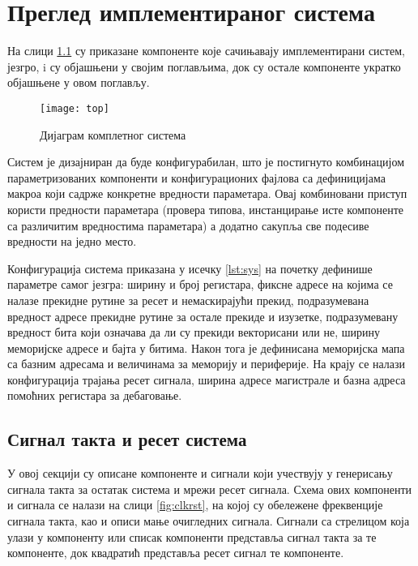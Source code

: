 \chapter{Преглед имплементираног система}

На слици \ref{fig:top} су приказане компоненте које сачињавају имплементирани систем,  језгро,  i  су објашњени у својим поглављима, док су остале компоненте укратко објашњене у овом поглављу. 

\begin{figure}[h!]
	\centering
	\texttt{[image: top]}
	\caption{Дијаграм комплетног система}
	\label{fig:top}
\end{figure}\newpage

Систем је дизајниран да буде конфигурабилан, што је постигнуто комбинацијом параметризованих компоненти и конфигурационих фајлова са дефиницијама макроа који садрже конкретне вредности параметара. Овај комбиновани приступ користи предности параметара (провера типова, инстанцирање исте компоненте са различитим вредностима параметара) а додатно сакупља све подесиве вредности на једно место. 



Конфигурација система приказана у исечку \ref{lst:sys} на почетку дефинише параметре самог језгра: ширину и број регистара, фиксне адресе на којима се налазе прекидне рутине за ресет и немаскирајући прекид, подразумевана вредност адресе прекидне рутине за остале прекиде и изузетке, подразумевану вредност бита који означава да ли су прекиди векторисани или не, ширину меморијске адресе и бајта у битима. Након тога је дефинисана меморијска мапа са базним адресама и величинама за меморију и периферије. На крају се налази конфигурација трајања ресет сигнала, ширина адресе  магистрале и базна адреса помоћних регистара за дебаговање.\newpage

\section{Сигнал такта и ресет система}

У овој секцији су описане компоненте и сигнали који учествују у генерисању сигнала такта за остатак система и мрежи ресет сигнала.
Схема ових компоненти и сигнала се налази на слици \ref{fig:clkrst}, на којој су обележене фреквенције сигнала такта, као и описи мање очигледних сигнала. Сигнали са стрелицом која улази у компоненту или списак компоненти представља сигнал такта за те компоненте, док квадратић представља ресет сигнал те компоненте. 

